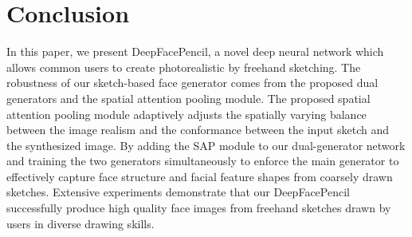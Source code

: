 \documentclass[sigconf,anonymous,review]{acmart}
\begin{document}
\maketitle







\section{Conclusion}
In this paper, we present DeepFacePencil, a novel deep neural network which allows common users to create photorealistic by freehand sketching.
%
The robustness of our sketch-based face generator comes from the proposed dual generators and the spatial attention pooling module. 
%
The proposed spatial attention pooling module adaptively adjusts the spatially varying balance between the image realism and the conformance between the input sketch and the synthesized image. 
%
By adding the SAP module to our dual-generator network and training the two generators simultaneously to enforce the main generator to effectively capture face structure and facial feature shapes from coarsely drawn sketches. 
Extensive experiments demonstrate that our DeepFacePencil successfully produce high quality face images from freehand sketches drawn by users in diverse drawing skills.
%




\balance 

%
\end{document}
